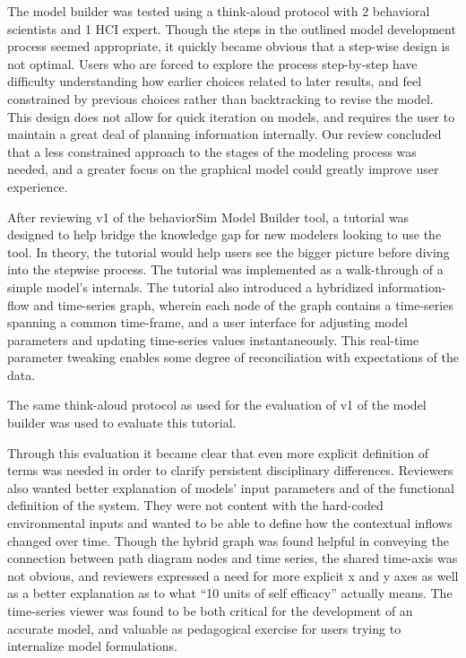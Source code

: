 \documentclass{sigchi}
\begin{document}
The model builder was tested using a think-aloud protocol with 2 behavioral scientists and 1 HCI expert. 
Though the steps in the outlined model development process seemed appropriate, it quickly became obvious that a step-wise design is not optimal.
Users who are forced to explore the process step-by-step have difficulty understanding how earlier choices related to later results, and feel constrained by previous choices rather than backtracking to revise the model.
This design does not allow for quick iteration on models, and requires the user to maintain a great deal of planning information internally.
Our review concluded that a less constrained approach to the stages of the modeling process was needed, and a greater focus on the graphical model could greatly improve user experience.

After reviewing v1 of the behaviorSim Model Builder tool, a tutorial was designed to help bridge the knowledge gap for new modelers looking to use the tool.
In theory, the tutorial would help users see the bigger picture before diving into the stepwise process.
The tutorial was implemented as a walk-through of a simple model's internals.
The tutorial also introduced a hybridized information-flow and time-series graph, wherein each node of the graph contains a time-series spanning a common time-frame, and a user interface for adjusting model parameters and updating time-series values instantaneously.
This real-time parameter tweaking enables some degree of reconciliation with expectations of the data.

The same think-aloud protocol as used for the evaluation of v1 of the model builder was used to evaluate this tutorial. 

Through this evaluation it became clear that even more explicit definition of terms was needed in order to clarify persistent disciplinary differences.
Reviewers also wanted better explanation of models' input parameters and of the functional definition of the system.
They were not content with the hard-coded environmental inputs and wanted to be able to define how the contextual inflows changed over time.
Though the hybrid graph was found helpful in conveying the connection between path diagram nodes and time series, the shared time-axis was not obvious, and reviewers expressed a need for more explicit x and y axes as well as a better explanation as to what ``10 units of self efficacy'' actually means.
The time-series viewer was found to be both critical for the development of an accurate model, and valuable as pedagogical exercise for users trying to internalize model formulations.
 
\end{document}
